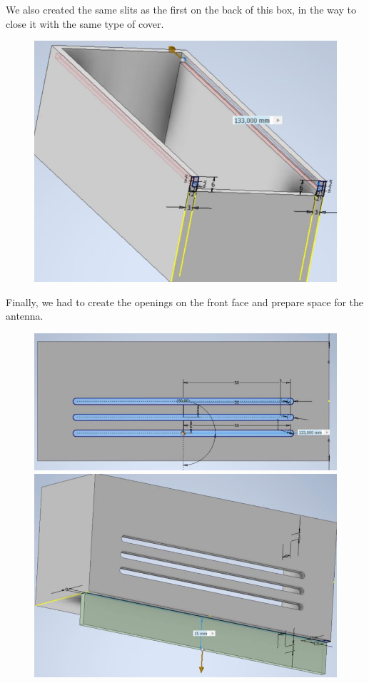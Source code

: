 We also created the same slits as the first on the back of this box, in the way to close it with the same type of cover.
\begin{figure}[H]
    \centering
    \includegraphics[width=.7\textwidth]{images/casing/img41.jpg}
\end{figure}

Finally, we had to create the openings on the front face and prepare space for the antenna.
\begin{figure}[H]
    \centering
    \includegraphics[width=.7\textwidth]{images/casing/img42.jpg}
    \includegraphics[width=.7\textwidth]{images/casing/img43.jpg}
\end{figure}

